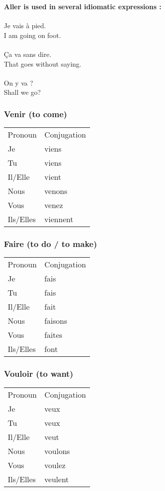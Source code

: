 \vspace{0.2in}
\noindent \textbf{Aller is used in several idiomatic expressions :}\\\\
Je vais \`{a} pied.\\
I am going on foot.\\\\
\c{C}a va sans dire.\\
That goes without saying.\\\\
On y va ?\\
Shall we go?

\subsubsection{Venir (to come)}
\begin{tabular}{| l | l |}
\hline
Pronoun 	& 	Conjugation	\\
Je		    &	viens		\\
Tu		    &	viens		\\
Il/Elle		&	vient		\\
Nous		&	venons		\\
Vous		&	venez		\\
Ils/Elles	&	viennent		\\
\hline
\end{tabular}

\subsubsection{Faire (to do / to make)}
\begin{tabular}{| l | l |}
\hline
Pronoun 	& 	Conjugation	\\
Je		    &	fais		\\
Tu		    &	fais		\\
Il/Elle		&	fait		\\
Nous		&	faisons		\\
Vous		&	faites		\\
Ils/Elles	&	font		\\
\hline
\end{tabular}

\subsubsection{Vouloir (to want)}
\begin{tabular}{| l | l |}
\hline
Pronoun 	& 	Conjugation	\\
Je		    & veux        \\
Tu		    & veux        \\
Il/Elle		& veut        \\
Nous		& voulons     \\
Vous		& voulez      \\
Ils/Elles	& veulent     \\
\hline
\end{tabular}


